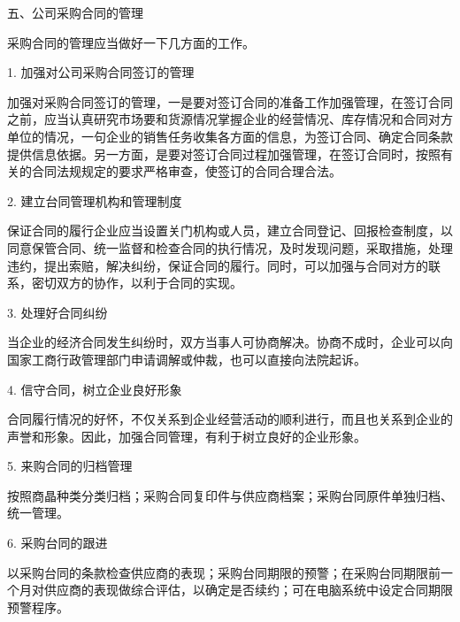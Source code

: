 五、公司采购合同的管理

    采购合同的管理应当做好一下几方面的工作。

    1. 加强对公司采购合同签订的管理

    加强对采购合同签订的管理，一是要对签订合同的准备工作加强管理，在签订合同之前，应当认真研究市场要和货源情况掌握企业的经营情况、库存情况和合同对方单位的情况，一句企业的销售任务收集各方面的信息，为签订合同、确定合同条款提供信息依据。另一方面，是要对签订合同过程加强管理，在签订合同时，按照有关的合同法规规定的要求严格审查，使签订的合同合理合法。

    2. 建立台同管理机构和管理制度

    保证合同的履行企业应当设置关门机构或人员，建立合同登记、回报检查制度，以同意保管合同、统一监督和检查合同的执行情况，及时发现问题，采取措施，处理违约，提出索赔，解决纠纷，保证合同的履行。同时，可以加强与合同对方的联系，密切双方的协作，以利于合同的实现。

    3. 处理好合同纠纷

    当企业的经济合同发生纠纷时，双方当事人可协商解决。协商不成时，企业可以向国家工商行政管理部门申请调解或仲裁，也可以直接向法院起诉。

    4. 信守合同，树立企业良好形象

    合同履行情况的好怀，不仅关系到企业经营活动的顺利进行，而且也关系到企业的声誉和形象。因此，加强合同管理，有利于树立良好的企业形象。

    5. 来购合同的归档管理

    按照商晶种类分类归档；采购合同复印件与供应商档案；采购台同原件单独归档、统一管理。

    6. 采购台同的跟进

    以采购台同的条款检查供应商的表现；采购台同期限的预警；在采购台同期限前一个月对供应商的表现做综合评估，以确定是否续约；可在电脑系统中设定合同期限预警程序。
